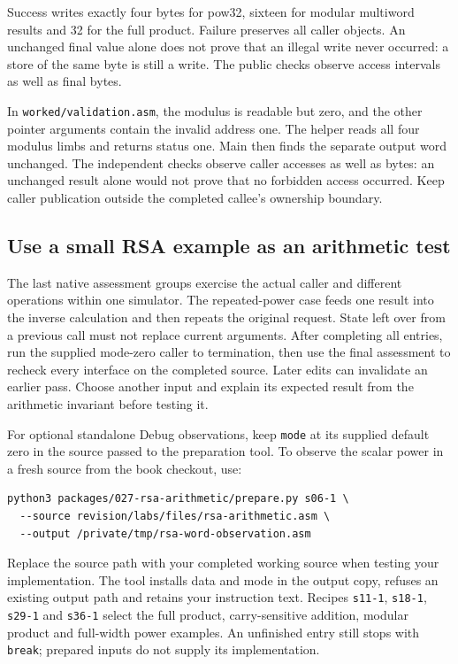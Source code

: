 

Success writes exactly four bytes for pow32, sixteen for modular multiword
results and 32 for the full product. Failure preserves all caller objects.
An unchanged final value alone does not prove that an illegal write never occurred:
a store of the same byte is still a write. The public checks observe access
intervals as well as final bytes.

In \texttt{worked/validation.asm}, the modulus is readable but zero, and
the other pointer arguments contain the invalid address one. The helper reads
all four modulus limbs and returns status one. Main then finds the separate
output word unchanged. The independent checks observe caller accesses as well
as bytes: an unchanged result alone would not prove that no forbidden access
occurred. Keep caller publication outside the completed callee's ownership
boundary.

\subsection*{Use a small RSA example as an arithmetic test}

The last native assessment groups exercise the actual caller and different
operations within one simulator. The repeated-power case feeds one result into
the inverse calculation and then repeats the original request. State left over
from a previous call must not replace current arguments. After completing all
entries, run the supplied mode-zero caller to termination, then use the final
assessment to recheck every interface on the completed source. Later edits can
invalidate an earlier pass. Choose another input and explain its expected result
from the arithmetic invariant before testing it.

For optional standalone Debug observations, keep \texttt{mode} at its supplied
default zero in the source passed to the preparation tool. To observe the scalar power in a fresh source from the book
checkout, use:

\begin{Verbatim}[fontsize=\small]
python3 packages/027-rsa-arithmetic/prepare.py s06-1 \
  --source revision/labs/files/rsa-arithmetic.asm \
  --output /private/tmp/rsa-word-observation.asm
\end{Verbatim}

Replace the source path with your completed working source when testing your
implementation. The tool installs data and mode in the output copy, refuses an
existing output path and retains your instruction text. Recipes
\texttt{s11-1}, \texttt{s18-1}, \texttt{s29-1} and \texttt{s36-1} select the
full product, carry-sensitive addition, modular product and full-width power
examples. An unfinished entry still stops with \texttt{break}; prepared inputs
do not supply its implementation.

